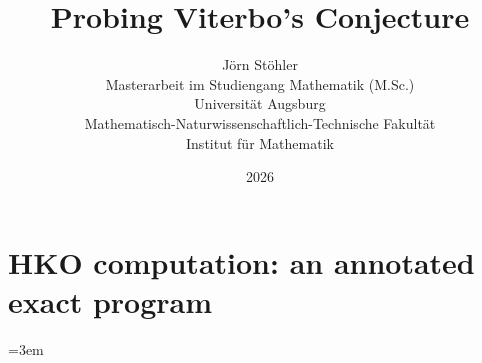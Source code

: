 \documentclass[a4paper,11pt]{article}
\title{Probing Viterbo's Conjecture}
\author{J\"orn St\"ohler\\[0.6em]
\normalsize Masterarbeit im Studiengang Mathematik (M.Sc.)\\
\normalsize Universit\"at Augsburg\\
\normalsize Mathematisch-Naturwissenschaftlich-Technische Fakult\"at\\
\normalsize Institut f\"ur Mathematik}
\date{2026}
\begin{document}
\maketitle

\begin{abstract}

\end{abstract}



\begingroup
\small
\linespread{0.96}\selectfont
\tableofcontents
\endgroup
\clearpage



















\appendix


\clearpage
\section{HKO computation: an annotated exact program}


\FloatBarrier
\begingroup
\emergencystretch=3em
\printbibliography[heading=bibintoc]
\endgroup
\end{document}
